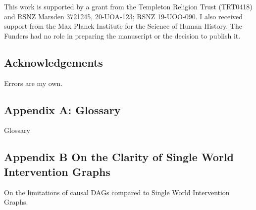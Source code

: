 \documentclass[
  single column]{article}
\begin{document}
This work is supported by a grant from the Templeton Religion Trust
(TRT0418) and RSNZ Marsden 3721245, 20-UOA-123; RSNZ 19-UOO-090. I also
received support from the Max Planck Institute for the Science of Human
History. The Funders had no role in preparing the manuscript or the
decision to publish it.

\subsection{Acknowledgements}\label{acknowledgements}

Errors are my own.

\subsection{Appendix A: Glossary}\label{appendix-a-glossary}

\begin{table}

\caption{\label{tbl-gloassary}Glossary}

\centering{

\glossaryTerms

}

\end{table}%

\subsection{Appendix B On the Clarity of Single World Intervention
Graphs}\label{appendix-b-on-the-clarity-of-single-world-intervention-graphs}

\newpage{}

\begin{table}

\caption{\label{tbl-pearltable}On the limitations of causal DAGs
compared to Single World Intervention Graphs.}

\centering{

\pearltable

}

\end{table}%
\end{document}
